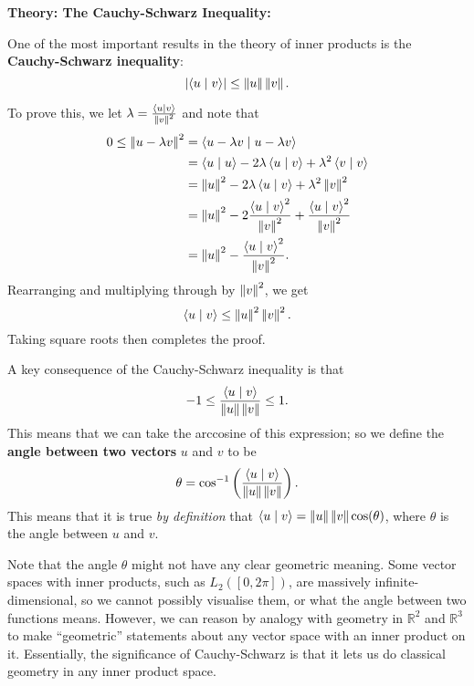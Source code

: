 \documentclass{article}
\newcommand{\norm}[1]{\left|\kern-1pt\left|#1\right|\kern-1pt\right|}
\newcommand{\braket}[2]{\left\langle #1 \mid #2 \right\rangle}
\begin{document}
\clearpage












\textbf{Theory: The Cauchy-Schwarz Inequality:}

\bigskip

One of the most important results in the theory of inner products is the \textbf{Cauchy-Schwarz inequality}:
\[\left|\braket{u}{v}\right|\leq \norm{u}\norm{v}.\]

To prove this, we let $\lambda=\frac{\braket{u}{v}}{\norm{v}^2}$ and note that
\begin{align*}
	0\leq \norm{u-\lambda v}^2&= \braket{u-\lambda v}{u-\lambda v}\\
	&= \braket{u}{u} -2\lambda\braket{u}{v} + \lambda^2 \braket{v}{v}\\
	&= \norm{u}^2 -2\lambda\braket{u}{v}+\lambda^2\norm{v}^2\\
	&=\norm{u}^2 - 2\frac{\braket{u}{v}^2}{\norm{v}^2} + \frac{\braket{u}{v}^2}{\norm{v}^2}\\
	&= \norm{u}^2 -\frac{\braket{u}{v}^2}{\norm{v}^2}.
\end{align*}
Rearranging and multiplying through by $\norm{v}^2$, we get
\[\braket{u}{v}\leq \norm{u}^2\norm{v}^2.\]
Taking square roots then completes the proof.\bigskip

A key consequence of the Cauchy-Schwarz inequality is that
\[-1\leq \frac{\braket{u}{v}}{\norm{u}\norm{v}}\leq 1.\]
This means that we can take the arccosine of this expression; so we define the \textbf{angle between two vectors} $u$ and $v$ to be
\[\theta=\cos^{-1}\left(\frac{\braket{u}{v}}{\norm{u}\norm{v}}\right).\]
This means that it is true \textit{by definition} that $\braket{u}{v}=\norm{u}\norm{v}\cos(\theta)$, where $\theta$ is the angle between $u$ and $v$.\bigskip

Note that the angle $\theta$ might not have any clear geometric meaning. Some vector spaces with inner products, such as $L_2([0,2\pi])$, are massively infinite-dimensional, so we cannot possibly visualise them, or what the angle between two functions means. However, we can reason by analogy with geometry in $\mathbb{R}^2$ and $\mathbb{R}^3$ to make ``geometric'' statements about any vector space with an inner product on it. Essentially, the significance of Cauchy-Schwarz is that it lets us do classical geometry in any inner product space.
\end{document}

